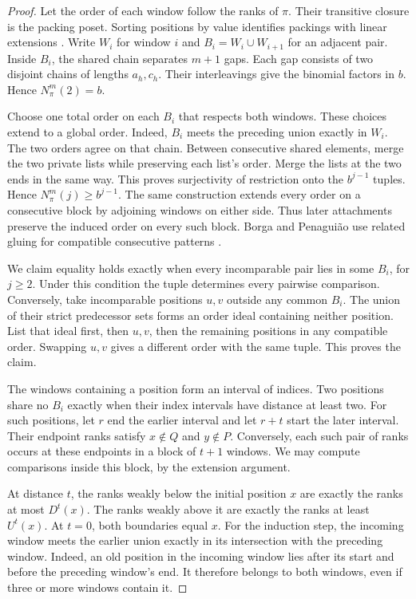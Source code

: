 \documentclass[11pt]{article}
\newcommand{\N}{N_\pi^m}
\begin{document}
\begin{proof}
Let the order of each window follow the ranks of $\pi$.
Their transitive closure is the packing poset. Sorting positions by value identifies packings with linear extensions \cite[Theorem~5.3]{bks}.
Write $W_i$ for window $i$ and $B_i=W_i\cup W_{i+1}$ for an adjacent pair.
Inside $B_i$, the shared chain separates $m+1$ gaps.
Each gap consists of two disjoint chains of lengths $a_h,c_h$.
Their interleavings give the binomial factors in $b$. Hence $\N(2)=b$.

Choose one total order on each $B_i$ that respects both windows.
These choices extend to a global order.
Indeed, $B_i$ meets the preceding union exactly in $W_i$. The two orders agree on that chain.
Between consecutive shared elements, merge the two private lists while preserving each list's order.
Merge the lists at the two ends in the same way.
This proves surjectivity of restriction onto the $b^{j-1}$ tuples. Hence $\N(j)\ge b^{j-1}$.
The same construction extends every order on a consecutive block by adjoining windows on either side.
Thus later attachments preserve the induced order on every such block.
Borga and Penagui\~ao use related gluing for compatible consecutive patterns \cite{bp}.

We claim equality holds exactly when every incomparable pair lies in some $B_i$, for $j\ge2$.
Under this condition the tuple determines every pairwise comparison.
Conversely, take incomparable positions $u,v$ outside any common $B_i$.
The union of their strict predecessor sets forms an order ideal containing neither position.
List that ideal first, then $u,v$, then the remaining positions in any compatible order.
Swapping $u,v$ gives a different order with the same tuple. This proves the claim.

The windows containing a position form an interval of indices.
Two positions share no $B_i$ exactly when their index intervals have distance at least two.
For such positions, let $r$ end the earlier interval and let $r+t$ start the later interval.
Their endpoint ranks satisfy $x\notin Q$ and $y\notin P$.
Conversely, each such pair of ranks occurs at these endpoints in a block of $t+1$ windows.
We may compute comparisons inside this block, by the extension argument.

At distance $t$, the ranks weakly below the initial position $x$ are exactly the ranks at most $D^t(x)$.
The ranks weakly above it are exactly the ranks at least $U^t(x)$.
At $t=0$, both boundaries equal $x$.
For the induction step, the incoming window meets the earlier union exactly in its intersection with the preceding window.
Indeed, an old position in the incoming window lies after its start and before the preceding window's end.
It therefore belongs to both windows, even if three or more windows contain it.


\end{proof}
\end{document}
